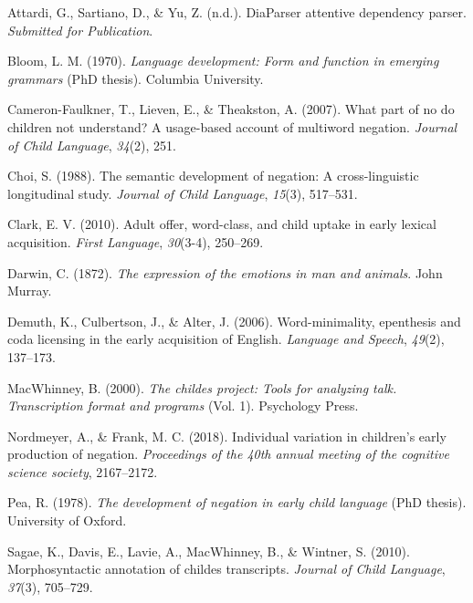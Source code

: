 \documentclass[
  english,
  man,floatsintext]{apa6}
\begin{document}
\endgroup

\hypertarget{refs}{}
\leavevmode\hypertarget{ref-diaparser}{}%
Attardi, G., Sartiano, D., \& Yu, Z. (n.d.). DiaParser attentive dependency parser. \emph{Submitted for Publication}.

\leavevmode\hypertarget{ref-bloom1970language}{}%
Bloom, L. M. (1970). \emph{Language development: Form and function in emerging grammars} (PhD thesis). Columbia University.

\leavevmode\hypertarget{ref-cameron2007part}{}%
Cameron-Faulkner, T., Lieven, E., \& Theakston, A. (2007). What part of no do children not understand? A usage-based account of multiword negation. \emph{Journal of Child Language}, \emph{34}(2), 251.

\leavevmode\hypertarget{ref-choi1988semantic}{}%
Choi, S. (1988). The semantic development of negation: A cross-linguistic longitudinal study. \emph{Journal of Child Language}, \emph{15}(3), 517--531.

\leavevmode\hypertarget{ref-clark2010adult}{}%
Clark, E. V. (2010). Adult offer, word-class, and child uptake in early lexical acquisition. \emph{First Language}, \emph{30}(3-4), 250--269.

\leavevmode\hypertarget{ref-darwin1872expression}{}%
Darwin, C. (1872). \emph{The expression of the emotions in man and animals}. John Murray.

\leavevmode\hypertarget{ref-demuth2006word}{}%
Demuth, K., Culbertson, J., \& Alter, J. (2006). Word-minimality, epenthesis and coda licensing in the early acquisition of English. \emph{Language and Speech}, \emph{49}(2), 137--173.

\leavevmode\hypertarget{ref-macwhinney2000childes}{}%
MacWhinney, B. (2000). \emph{The childes project: Tools for analyzing talk. Transcription format and programs} (Vol. 1). Psychology Press.

\leavevmode\hypertarget{ref-nordmeyer2018individual}{}%
Nordmeyer, A., \& Frank, M. C. (2018). Individual variation in children's early production of negation. \emph{Proceedings of the 40th annual meeting of the cognitive science society}, 2167--2172.

\leavevmode\hypertarget{ref-pea1978}{}%
Pea, R. (1978). \emph{The development of negation in early child language} (PhD thesis). University of Oxford.

\leavevmode\hypertarget{ref-sagae2010morphosyntactic}{}%
Sagae, K., Davis, E., Lavie, A., MacWhinney, B., \& Wintner, S. (2010). Morphosyntactic annotation of childes transcripts. \emph{Journal of Child Language}, \emph{37}(3), 705--729.
\end{document}
